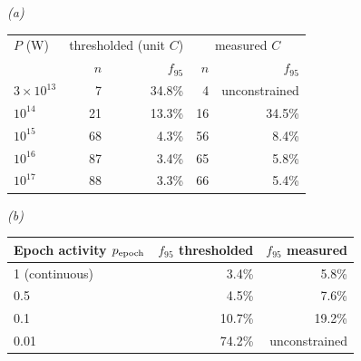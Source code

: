 \emph{(a)}\\[2pt]
\begin{tabular}{@{}lrrrr@{}}
\toprule
$P$ (W) & \multicolumn{2}{c}{thresholded (unit $C$)} &
\multicolumn{2}{c}{measured $C$} \\
 & $n$ & $f_{95}$ & $n$ & $f_{95}$ \\
\midrule
$3\times10^{13}$ & 7 & 34.8\% & 4 & unconstrained \\
$10^{14}$ & 21 & 13.3\% & 16 & 34.5\% \\
$10^{15}$ & 68 & 4.3\% & 56 & 8.4\% \\
$10^{16}$ & 87 & 3.4\% & 65 & 5.8\% \\
$10^{17}$ & 88 & 3.3\% & 66 & 5.4\% \\
\bottomrule
\end{tabular}

\smallskip
\emph{(b)}\\[2pt]
\begin{tabular}{@{}lrr@{}}
\toprule
Epoch activity $p_{\rm epoch}$ & $f_{95}$ thresholded & $f_{95}$ measured \\
\midrule
1 (continuous) & 3.4\% & 5.8\% \\
0.5 & 4.5\% & 7.6\% \\
0.1 & 10.7\% & 19.2\% \\
0.01 & 74.2\% & unconstrained \\
\bottomrule
\end{tabular}
